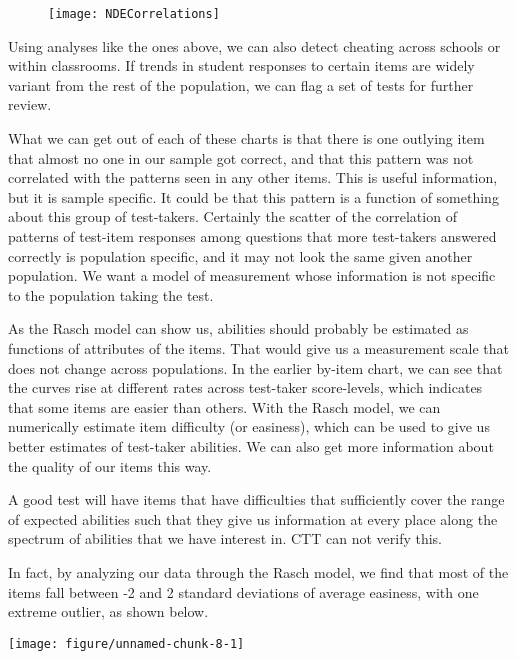 \documentclass{article}\usepackage[]{graphicx}\usepackage[]{color}
\newenvironment{knitrout}{}{} %
\begin{document}
\begin{enumerate}
\centering
\begin{figure}

\texttt{[image: NDECorrelations]}
\end{figure}
\raggedright
Using analyses like the ones above, we can also detect cheating across schools or within classrooms. If trends in student responses to certain items are widely variant from the rest of the population, we can flag a set of tests for further review.
\raggedright

What we can get out of each of these charts is that there is one outlying item that almost no one in our sample got correct, and that this pattern was not correlated with the patterns seen in any other items. This is useful information, but it is sample specific. It could be that this pattern is a function of something about this group of test-takers. Certainly the scatter of the correlation of patterns of test-item responses among questions that more test-takers answered correctly is population specific, and it may not look the same given another population. We want a model of measurement whose information is not specific to the population taking the test.
\raggedright

As the Rasch model can show us, abilities should probably be estimated as functions of attributes of the items. That would give us a measurement scale that does not change across populations. In the earlier by-item chart, we can see that the curves rise at different rates across test-taker score-levels, which indicates that some items are easier than others. With the Rasch model, we can numerically estimate item difficulty (or easiness), which can be used to give us better estimates of test-taker abilities. We can also get more information about the quality of our items this way.
\raggedright

A good test will have items that have difficulties that sufficiently cover the range of expected abilities such that they give us information at every place along the spectrum of abilities that we have interest in. CTT can not verify this.
\raggedright

In fact, by analyzing our data through the Rasch model, we find that most of the items fall between -2 and 2 standard deviations of average easiness, with one extreme outlier, as shown below.

\centering
\begin{knitrout}
\color{fgcolor}

{\centering \texttt{[image: figure/unnamed-chunk-8-1]} 

}
\end{knitrout}
\end{enumerate}
\end{document}
